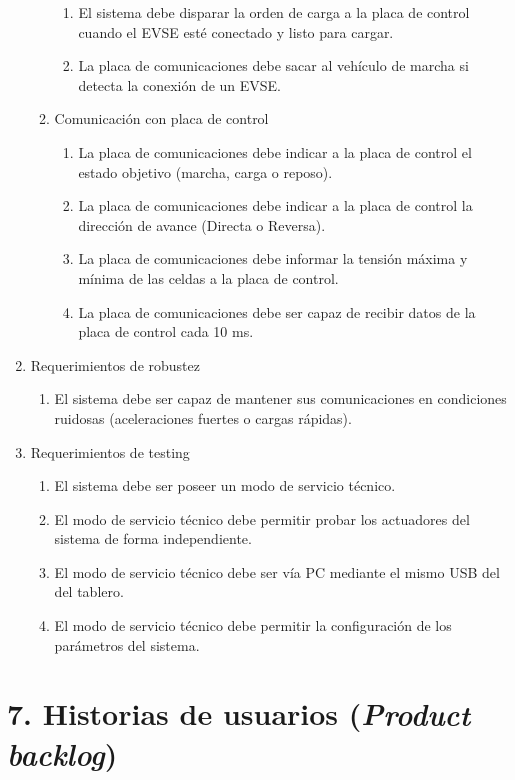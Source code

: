 \documentclass[
11pt, %
codirector, %
]{charter}
\begin{document}
\begin{enumerate}
\begin{enumerate}
\begin{enumerate}
			            \item El sistema debe disparar la orden de carga a la placa de control cuando el EVSE esté conectado y listo para cargar.
			            \item La placa de comunicaciones debe sacar al vehículo de marcha si detecta la conexión de un EVSE.
		            \end{enumerate}
		      \item Comunicación con placa de control
		            \begin{enumerate}
			            \item La placa de comunicaciones debe indicar a la placa de control el estado objetivo (marcha, carga o reposo).
			            \item La placa de comunicaciones debe indicar a la placa de control la dirección de avance (Directa o Reversa).
			            \item La placa de comunicaciones debe informar la tensión máxima y mínima de las celdas a la placa de control.
			            \item La placa de comunicaciones debe ser capaz de recibir datos de la placa de control cada 10 ms.
		            \end{enumerate}
	      \end{enumerate}
	\item Requerimientos de robustez
	      \begin{enumerate}
		      \item El sistema debe ser capaz de mantener sus comunicaciones en condiciones ruidosas (aceleraciones fuertes o cargas rápidas).
	      \end{enumerate}
	\item Requerimientos de testing
	      \begin{enumerate}
		      \item El sistema debe ser poseer un modo de servicio técnico.
		      \item El modo de servicio técnico debe permitir probar los actuadores del sistema de forma independiente.
		      \item El modo de servicio técnico debe ser vía PC mediante el mismo USB del del tablero.
		      \item El modo de servicio técnico debe permitir la configuración de los parámetros del sistema.
	      \end{enumerate}
\end{enumerate}


\section{7. Historias de usuarios (\textit{Product backlog})}
\label{sec:backlog}
\end{document}
